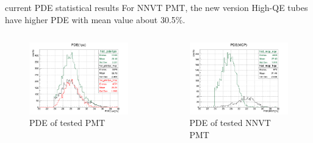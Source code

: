 \begin{frame}{current PDE statistical results}
For NNVT PMT, the new version High-QE tubes have higher PDE with mean value about 30.5\%.
\begin{columns}
\begin{column}{.5\textwidth}
\begin{figure}
\centering
\includegraphics[width=\textwidth]{figures/pde1pe.png} %
\caption{PDE of tested PMT}
\end{figure}
\end{column}
\begin{column}{.5\textwidth}
\begin{figure}
\centering
\includegraphics[width=\textwidth]{figures/pdemcp.png} %
\caption{PDE of tested NNVT PMT}
\end{figure}
\end{column}
\end{columns}
\end{frame}
